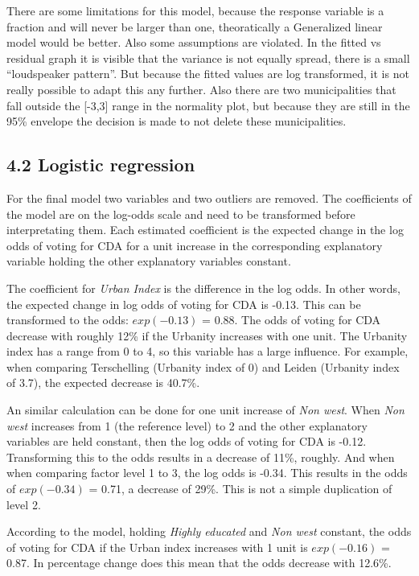 \documentclass[11pt,]{article}
\begin{document}
There are some limitations for this model, because the response variable
is a fraction and will never be larger than one, theoratically a
Generalized linear model would be better. Also some assumptions are
violated. In the fitted vs residual graph it is visible that the
variance is not equally spread, there is a small ``loudspeaker
pattern''. But because the fitted values are log transformed, it is not
really possible to adapt this any further. Also there are two
municipalities that fall outside the {[}-3,3{]} range in the normality
plot, but because they are still in the 95\% envelope the decision is
made to not delete these municipalities.

\subsection{4.2 Logistic regression}\label{logistic-regression-1}

For the final model two variables and two outliers are removed. The
coefficients of the model are on the log-odds scale and need to be
transformed before interpretating them. Each estimated coefficient is
the expected change in the log odds of voting for CDA for a unit
increase in the corresponding explanatory variable holding the other
explanatory variables constant.

The coefficient for \emph{Urban Index} is the difference in the log
odds. In other words, the expected change in log odds of voting for CDA
is -0.13. This can be transformed to the odds: \(exp(-0.13)\) = 0.88.
The odds of voting for CDA decrease with roughly 12\% if the Urbanity
increases with one unit. The Urbanity index has a range from 0 to 4, so
this variable has a large influence. For example, when comparing
Terschelling (Urbanity index of 0) and Leiden (Urbanity index of 3.7),
the expected decrease is 40.7\%.

An similar calculation can be done for one unit increase of \emph{Non
west}. When \emph{Non west} increases from 1 (the reference level) to 2
and the other explanatory variables are held constant, then the log odds
of voting for CDA is -0.12. Transforming this to the odds results in a
decrease of 11\%, roughly. And when when comparing factor level 1 to 3,
the log odds is -0.34. This results in the odds of \(exp(-0.34)\) =
0.71, a decrease of 29\%. This is not a simple duplication of level 2.

According to the model, holding \emph{Highly educated} and \emph{Non
west} constant, the odds of voting for CDA if the Urban index increases
with 1 unit is \(exp(-0.16)\) = 0.87. In percentage change does this
mean that the odds decrease with 12.6\%.
\end{document}
